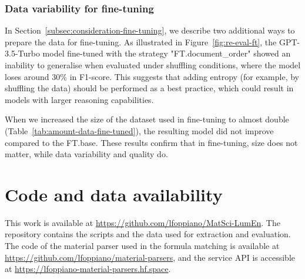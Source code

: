 \subsubsection{Data variability for fine-tuning}
\label{subsubsec:data-variability}

In Section~\ref{subsec:consideration-fine-tuning}, we describe two additional ways to prepare the data for fine-tuning. 
As illustrated in Figure~\ref{fig:re-eval-ft}, the GPT-3.5-Turbo model fine-tuned with the strategy "FT.document\_order" showed an inability to generalise when evaluated under shuffling conditions, where the model loses around 30\% in F1-score.
This suggests that adding entropy (for example, by shuffling the data) should be performed as a best practice, which could result in models with larger reasoning capabilities.

When we increased the size of the dataset used in fine-tuning to almost double (Table~\ref{tab:amount-data-fine-tuned}), the resulting model did not improve compared to the FT.base. These results confirm that in fine-tuning, size does not matter, while data variability and quality do. 





\section{Code and data availability}
This work is available at \url{https://github.com/lfoppiano/MatSci-LumEn}. The repository contains the scripts and the data used for extraction and evaluation. 
The code of the material parser used in the formula matching is available at \url{https://github.com/lfoppiano/material-parsers}, and the service API is accessible at \url{https://lfoppiano-material-parsers.hf.space}. 

